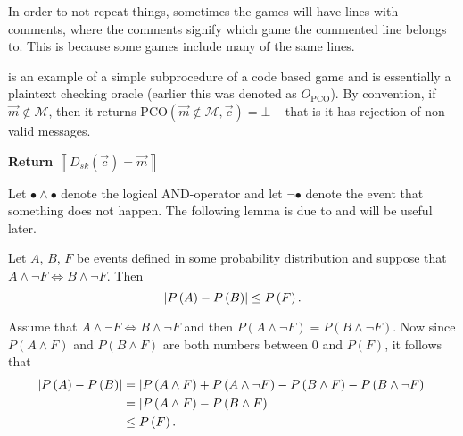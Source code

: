 In order to not repeat things, sometimes the games will have lines with comments, where the comments signify which game the commented line belongs to. This is because some games include many of the same lines.

 is an example of a simple subprocedure of a code based game and is essentially a plaintext checking oracle (earlier this was denoted as $O_{\mathrm{PCO}}$). By convention, if $\vec{m} \notin \mathcal{M}$, then it returns $\mathrm{PCO}\left(\vec{m} \notin \mathcal{M}, \vec{c}\right) = \bot$ -- that is it has rejection of non-valid messages.

\begin{center}
	\begin{minipage}[ht!]{0.5\textwidth}
		\begin{algorithm}[H]
			\centering
			\caption{$\mathrm{PCO}\left(\vec{m} \in \mathcal{M}, \vec{c}\right)$}
			\label{alg:PCO}
			\begin{algorithmic}
				\State \textbf{Return} $\left\llbracket D_{sk}\left(\vec{c}\right) = \vec{m} \right\rrbracket$
			\end{algorithmic}
		\end{algorithm}
	\end{minipage}
\end{center}

Let $\bullet \land \bullet$ denote the logical $\mathrm{AND}$-operator and let $\neg \bullet$ denote the event that something does not happen. The following lemma is due to \cite{shoup} and will be useful later.
\begin{lem}
\label{lem:DiffLemm}
	Let $A$, $B$, $F$ be events defined in some probability distribution and suppose that $A \land \neg F \Leftrightarrow B \land \neg F$. Then
	\[
		\left\vert P\left(A\right) - P\left(B\right) \right\vert \leq P\left(F\right).
	\]
	\begin{Proof}
		Assume that $A \land \neg F \Leftrightarrow B \land \neg F$ and then $P\left(A \land \neg F\right) = P\left(B \land \neg F\right)$. Now since $P\left(A \land F\right)$ and $P\left(B \land F\right)$ are both numbers between $0$ and $P\left(F\right)$, it follows that
		\begin{align*}
			\left\vert P\left(A\right) - P\left(B\right) \right\vert &= \left\vert P\left(A \land F\right) + P\left(A \land \neg F\right) - P\left(B \land F\right) - P\left(B \land \neg F\right) \right\vert\\
				&= \left\vert P\left(A \land F\right) - P\left(B \land F\right) \right\vert\\
				&\leq P\left(F\right).
		\end{align*}
	\end{Proof}
\end{lem}



